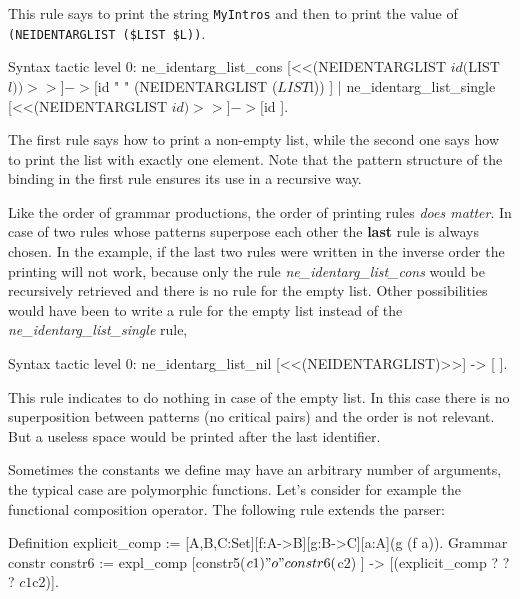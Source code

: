 This rule says to print the string \verb+MyIntros+ and then to print
the value of \\
\verb+(NEIDENTARGLIST ($LIST $L))+.

\begin{coq_example}
Syntax tactic level 0:
  ne_identarg_list_cons [<<(NEIDENTARGLIST $id ($LIST $l))>>]
                            -> [ $id " " (NEIDENTARGLIST ($LIST $l)) ]
| ne_identarg_list_single [<<(NEIDENTARGLIST $id)>>] -> [ $id ].
\end{coq_example}


The first rule says how to print a non-empty list, while the second
one says how to print the list with exactly one element. Note that the
pattern structure of the binding in the first rule ensures its use in
a recursive way.

Like the order of grammar productions, the order of printing rules
\emph{does matter}. In case of two rules whose patterns superpose
each other the {\bf last} rule is always chosen.  In the example, if
the last two rules were written in the inverse order the printing will
not work, because only the rule {\sl ne\_identarg\_list\_cons} would
be recursively retrieved and there is no rule for the empty list.
Other possibilities would have been to write a rule for the empty list
instead of the {\sl ne\_identarg\_list\_single} rule,

\begin{coq_example}
Syntax tactic level 0:
  ne_identarg_list_nil [<<(NEIDENTARGLIST)>>] -> [ ].
\end{coq_example}

This rule indicates to do nothing in case of the empty list.  In this
case there is no superposition between patterns (no critical pairs)
and the order is not relevant. But a useless space would be printed
after the last identifier.


Sometimes the constants we define may have an arbitrary number of
arguments, the typical case are polymorphic functions. Let's consider
for example the functional composition operator. The following rule
extends the parser:

\begin{coq_example*}
Definition explicit_comp := [A,B,C:Set][f:A->B][g:B->C][a:A](g (f a)).
Grammar constr constr6 :=
  expl_comp [constr5($c1) "o" constr6($c2) ] ->
            [(explicit_comp ? ? ? $c1 $c2)].
\end{coq_example*}

